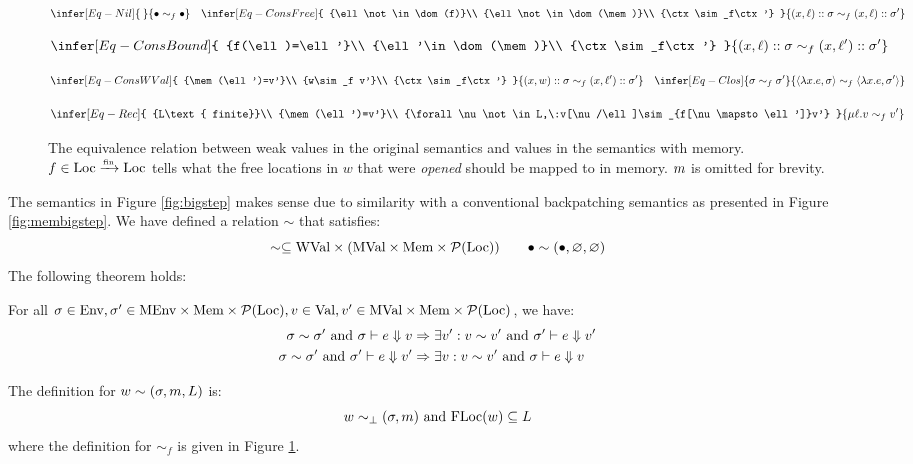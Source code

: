 \begin{figure}[h!]
  \centering
  \small
  \begin{flushright}
  \end{flushright}
  \[
    \infer[Eq-Nil]
    {\:}
    {\bullet\sim_f\bullet}
    \quad
    \infer[Eq-ConsFree]
    {
    {\ell\not\in\dom(f)}\\
    {\ell\not\in\dom(\mem)}\\
    {\ctx\sim_f\ctx'}
    }
    {(x,\ell)\cons\ctx\sim_f(x,\ell)\cons\ctx'}
  \]

  \[
    \infer[Eq-ConsBound]
    {
    {f(\ell)=\ell'}\\
    {\ell'\in\dom(\mem)}\\
    {\ctx\sim_f\ctx'}
    }
    {(x,\ell)\cons\ctx\sim_f(x,\ell')\cons\ctx'}
  \]

  \[
    \infer[Eq-ConsWVal]
    {
    {\mem(\ell')=v'}\\
    {w\sim_f v'}\\
    {\ctx\sim_f\ctx'}
    }
    {(x,w)\cons\ctx\sim_f(x,\ell')\cons\ctx'}
    \quad
    \infer[Eq-Clos]
    {\ctx\sim_f\ctx'}
    {\langle\lambda x.e,\ctx\rangle\sim_f\langle\lambda x.e,\ctx'\rangle}
  \]

  \[
    \infer[Eq-Rec]
    {
    {L\text{ finite}}\\
    {\mem(\ell')=v'}\\
    {\forall\nu\not\in L,\:v[\nu/\ell]\sim_{f[\nu\mapsto\ell']}v'}
    }
    {\mu\ell.v\sim_f v'}
  \]
  \caption{The equivalence relation between weak values in the original semantics and values in the semantics with memory.
    $f\in{\text{Loc}}\xrightarrow{\mbox{\tiny{fin}}}{\text{Loc}}$ tells what the free locations in $w$ that were \emph{opened} should be mapped to in memory.
    $m$ is omitted for brevity.}
  \label{fig:equivrel}
\end{figure}


The semantics in Figure \ref{fig:bigstep} makes sense due to similarity with a conventional backpatching semantics as presented in Figure \ref{fig:membigstep}.
We have defined a relation $\sim$ that satisfies:
\[\sim\subseteq\text{WVal}\times(\text{MVal}\times\text{Mem}\times\mathcal{P}({\text{Loc}}))\qquad\bullet\sim(\bullet,\varnothing,\varnothing)\]
The following theorem holds:
\begin{thm}\label{thm:equivsem}
  For all $\sigma\in\text{Env},\sigma'\in\text{MEnv}\times\text{Mem}\times\mathcal{P}({\text{Loc}}),v\in\text{Val},v'\in\text{MVal}\times\text{Mem}\times\mathcal{P}({\text{Loc}})$, we have:
  \begin{align*}
    \sigma\sim\sigma'\text{ and }{\sigma}\vdash{e}\Downarrow{v}   & \Rightarrow\exists v':v\sim v'\text{ and }{\sigma'}\vdash{e}\Downarrow{v'} \\
    \sigma\sim\sigma'\text{ and }{\sigma'}\vdash{e}\Downarrow{v'} & \Rightarrow\exists v:v\sim v'\text{ and }{\sigma}\vdash{e}\Downarrow{v}
  \end{align*}
\end{thm}

The definition for $w\sim(\sigma,m,L)$ is:
\[w\sim_\bot(\sigma,m)\text{ and }\text{FLoc}(w)\subseteq L\]
where the definition for $\sim_f$ is given in Figure \ref{fig:equivrel}.

